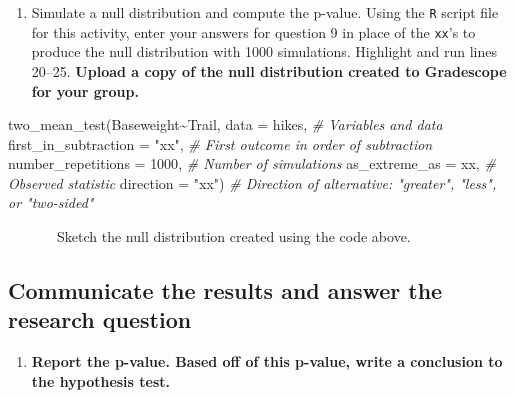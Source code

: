 \documentclass[
]{report}
\newenvironment{Shaded}{\begin{snugshade}}{\end{snugshade}}
\newcommand{\AttributeTok}[1]{\textcolor[rgb]{0.77,0.63,0.00}{#1}}
\newcommand{\CommentTok}[1]{\textcolor[rgb]{0.56,0.35,0.01}{\textit{#1}}}
\newcommand{\DecValTok}[1]{\textcolor[rgb]{0.00,0.00,0.81}{#1}}
\newcommand{\FunctionTok}[1]{\textcolor[rgb]{0.00,0.00,0.00}{#1}}
\newcommand{\NormalTok}[1]{#1}
\newcommand{\SpecialCharTok}[1]{\textcolor[rgb]{0.00,0.00,0.00}{#1}}
\newcommand{\StringTok}[1]{\textcolor[rgb]{0.31,0.60,0.02}{#1}}
\providecommand{\tightlist}{%
  \setlength{\itemsep}{0pt}\setlength{\parskip}{0pt}}
\begin{document}
\vspace{.2in}

\begin{enumerate}
\def\labelenumi{\arabic{enumi}.}
\setcounter{enumi}{9}
\tightlist
\item
  Simulate a null distribution and compute the p-value. Using the \texttt{R} script file for this activity, enter your answers for question 9 in place of the \texttt{xx}'s to produce the null distribution with 1000 simulations. Highlight and run lines 20--25. \textbf{Upload a copy of the null distribution created to Gradescope for your group.}
\end{enumerate}

\begin{Shaded}
\begin{Highlighting}[]
\FunctionTok{two\_mean\_test}\NormalTok{(Baseweight}\SpecialCharTok{\textasciitilde{}}\NormalTok{Trail, }
         \AttributeTok{data =}\NormalTok{ hikes,  }\CommentTok{\# Variables and data}
         \AttributeTok{first\_in\_subtraction =} \StringTok{"xx"}\NormalTok{, }\CommentTok{\# First outcome in order of subtraction}
         \AttributeTok{number\_repetitions =} \DecValTok{1000}\NormalTok{,  }\CommentTok{\# Number of simulations}
         \AttributeTok{as\_extreme\_as =}\NormalTok{ xx,  }\CommentTok{\# Observed statistic}
         \AttributeTok{direction =} \StringTok{"xx"}\NormalTok{)  }\CommentTok{\# Direction of alternative: "greater", "less", or "two{-}sided"}
\end{Highlighting}
\end{Shaded}

~~~~~~~Sketch the null distribution created using the code above.

\vspace{1.5in}

\hypertarget{communicate-the-results-and-answer-the-research-question-3}{%
\subsection*{Communicate the results and answer the research question}\label{communicate-the-results-and-answer-the-research-question-3}}

\begin{enumerate}
\def\labelenumi{\arabic{enumi}.}
\setcounter{enumi}{10}
\tightlist
\item
  \textbf{Report the p-value. Based off of this p-value, write a conclusion to the hypothesis test.}
\end{enumerate}
\end{document}
